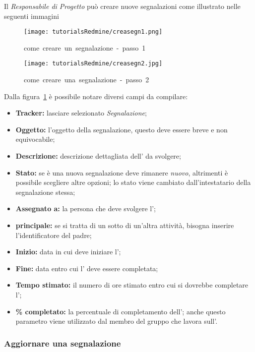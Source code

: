 \documentclass{scalatekids-article}
\begin{document}
Il \textit{Responsabile di Progetto} può creare nuove segnalazioni come illustrato nelle seguenti immagini
\begin{figure}[H]
  \centering
  \texttt{[image: tutorialsRedmine/creasegn1.png]}
  \caption{come\ creare\ un\ segnalazione\ -\ passo\ 1}
\end{figure}
\begin{figure}[H]
  \centering
  \texttt{[image: tutorialsRedmine/creasegn2.jpg]}
  \caption{come\ creare\ una\ segnalazione\ -\ passo\ 2\label{fig:crea-segnalazione-2}}
\end{figure}
Dalla figura~\ref{fig:crea-segnalazione-2} è possibile notare diversi campi da compilare:
\begin{itemize}
\item \textbf{Tracker:} lasciare selezionato \textit{Segnalazione};
\item \textbf{Oggetto:} l'oggetto della segnalazione, questo deve essere breve e non equivocabile;
\item \textbf{Descrizione:} descrizione dettagliata dell' da svolgere;
\item \textbf{Stato:} se è una nuova segnalazione deve rimanere \textit{nuovo}, altrimenti è possibile scegliere altre opzioni; lo stato viene cambiato dall'intestatario della segnalazione stessa;
\item \textbf{Assegnato a:} la persona che deve svolgere l';
\item \textbf{ principale:} se si tratta di un sotto  di un'altra attività, bisogna inserire l'identificatore del  padre;
\item \textbf{Inizio:} data in cui deve iniziare l';
\item \textbf{Fine:} data entro cui l' deve essere completata;
\item \textbf{Tempo stimato:} il numero di ore stimato entro cui si dovrebbe completare l';
\item \textbf{\% completato:} la percentuale di completamento dell'; anche questo parametro viene utilizzato dal membro del gruppo che lavora sull'.
\end{itemize}

\subsubsection{Aggiornare una segnalazione}
\end{document}
